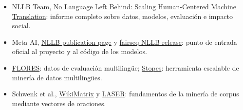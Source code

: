 \begingroup
\scriptsize
\begin{itemize}[itemsep=0pt,topsep=0.15em,parsep=0pt]
  \item NLLB Team, \href{https://arxiv.org/abs/2207.04672}{No Language Left Behind: Scaling Human-Centered Machine Translation}: informe completo sobre datos, modelos, evaluación e impacto social.
  \item Meta AI, \href{https://research.facebook.com/publications/no-language-left-behind/}{NLLB publication page} y \href{https://github.com/facebookresearch/fairseq/tree/nllb}{fairseq NLLB release}: punto de entrada oficial al proyecto y al código de los modelos.
  \item \href{https://github.com/facebookresearch/flores}{FLORES}: datos de evaluación multilingüe; \href{https://github.com/facebookresearch/stopes}{Stopes}: herramienta escalable de minería de datos multilingües.
  \item Schwenk et al., \href{https://arxiv.org/abs/1907.05791}{WikiMatrix} y \href{https://github.com/facebookresearch/LASER}{LASER}: fundamentos de la minería de corpus mediante vectores de oraciones.
\end{itemize}
\endgroup


